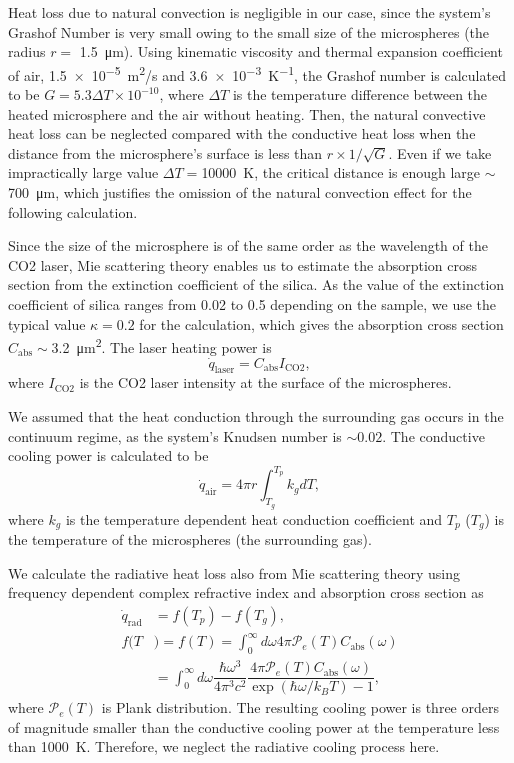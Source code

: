 \documentclass[aps,prl,preprint,groupedaddress]{revtex4-1}
\begin{document}
Heat loss due to natural convection is negligible in our case, since the system's Grashof Number\cite{mahony_heat_1957} is very small owing to the small size of the microspheres (the radius $r=$ \SI{1.5}{\micro \meter}). Using kinematic viscosity and thermal expansion coefficient of air, \SI{1.5e-5}{m^2/s}\cite{dwight_e._gray_ed._american_1957} and \SI{3.6e-3}{K^{-1}}\cite{roebuck_joule-thomson_1930}, the Grashof number is calculated to be $G=5.3\Delta T\times 10^{-10}$, where  $\Delta T$ is the temperature difference between the heated microsphere and the air without heating. Then, the natural convective heat loss can be neglected compared with the conductive heat loss\cite{mahony_heat_1957} when the distance from the microsphere's surface is less than $r \times 1/\sqrt{G}$. Even if we take impractically large value $\Delta T = $\SI{10000}{K}, the critical distance is enough large $\sim$\SI{700}{\micro \meter}, which justifies the omission of the natural convection effect for the following calculation. 

Since the size of the microsphere is of the same order as the wavelength of the CO2 laser, Mie scattering theory\cite{bohren_absorption_1983} enables us to estimate the absorption cross section\cite{leinonen_python_????} from the extinction coefficient of the silica. As the value of the extinction coefficient of silica ranges from 0.02 to 0.5 depending on the sample\cite{kitamura_optical_2007}, we use the typical value $\kappa = 0.2$ for the calculation, which gives the absorption cross section $C_\mathrm{abs}\sim$\SI{3.2}{\micro \meter^2}. The laser heating power is
\[
\dot{q}_\mathrm{laser}=C_\mathrm{abs}I_\mathrm{CO2},
\]
where $I_\mathrm{CO2}$ is the CO2 laser intensity at the surface of the microspheres.

We assumed that the heat conduction through the surrounding gas occurs in the continuum regime, as the system's Knudsen number is $\sim 0.02$. The conductive cooling power is calculated to be\cite{liu_heat_2006}
\[
\dot{q}_\mathrm{air}=4\pi r\int_{T_g}^{T_p}k_g dT,
\] 
where $k_g$ is the temperature dependent heat conduction coefficient and  $T_p$ ($T_g$) is the temperature of the microspheres (the surrounding gas).

We calculate the radiative heat loss also from Mie scattering theory\cite{bohren_absorption_1983,liu_theoretical_2006} using frequency dependent complex refractive index and absorption cross section\cite{kitamura_optical_2007} as
\begin{align*}
\dot{q}_\mathrm{rad}&=f(T_p)-f(T_g),\\
f(T&)=f(T)=\int_0^\infty d\omega  4\pi \mathcal{P}_e(T) C_\mathrm{abs}(\omega)\\
&=\int_0^\infty d\omega  \dfrac{\hbar\omega^3}{4\pi^3c^2}\dfrac{4\pi \mathcal{P}_e(T) C_\mathrm{abs}(\omega)}{\exp\left(\hbar \omega/k_B T \right)-1},
\end{align*}
where $\mathcal{P}_e(T)$ is Plank distribution. The resulting cooling power is three orders of magnitude smaller than the conductive cooling power at the temperature less than \SI{1000}{K}. Therefore, we neglect the radiative cooling process here.
\end{document}
